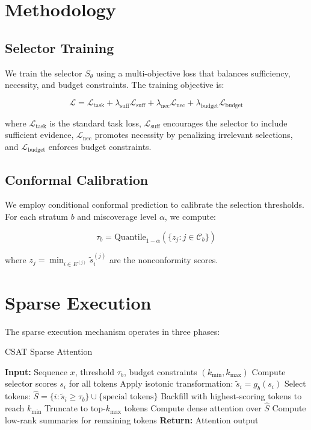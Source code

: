 \documentclass[11pt]{article}
\begin{document}
\section{Methodology}

\subsection{Selector Training}
We train the selector $S_\theta$ using a multi-objective loss that balances sufficiency, necessity, and budget constraints. The training objective is:

\begin{equation}
\mathcal{L} = \mathcal{L}_{\text{task}} + \lambda_{\text{suff}} \mathcal{L}_{\text{suff}} + \lambda_{\text{nec}} \mathcal{L}_{\text{nec}} + \lambda_{\text{budget}} \mathcal{L}_{\text{budget}}
\end{equation}

where $\mathcal{L}_{\text{task}}$ is the standard task loss, $\mathcal{L}_{\text{suff}}$ encourages the selector to include sufficient evidence, $\mathcal{L}_{\text{nec}}$ promotes necessity by penalizing irrelevant selections, and $\mathcal{L}_{\text{budget}}$ enforces budget constraints.

\subsection{Conformal Calibration}
We employ conditional conformal prediction to calibrate the selection thresholds. For each stratum $b$ and miscoverage level $\alpha$, we compute:

\begin{equation}
\tau_b = \text{Quantile}_{1-\alpha}(\{z_j : j \in \mathcal{C}_b\})
\end{equation}

where $z_j = \min_{i \in E^{(j)}} \tilde{s}^{(j)}_i$ are the nonconformity scores.

\section{Sparse Execution}
The sparse execution mechanism operates in three phases:

\begin{algorithm}
\caption{CSAT Sparse Attention}
\begin{algorithmic}[1]
\State \textbf{Input:} Sequence $x$, threshold $\tau_b$, budget constraints $(k_{\min}, k_{\max})$
\State Compute selector scores $s_i$ for all tokens
\State Apply isotonic transformation: $\tilde{s}_i = g_b(s_i)$
\State Select tokens: $\hat{S} = \{i : \tilde{s}_i \geq \tau_b\} \cup \{\text{special tokens}\}$
    \State Backfill with highest-scoring tokens to reach $k_{\min}$
\EndIf
{}
    \State Truncate to top-$k_{\max}$ tokens
\EndIf
\State Compute dense attention over $\hat{S}$
\State Compute low-rank summaries for remaining tokens
\State \textbf{Return:} Attention output
\end{algorithmic}
\end{algorithm}
\end{document}
